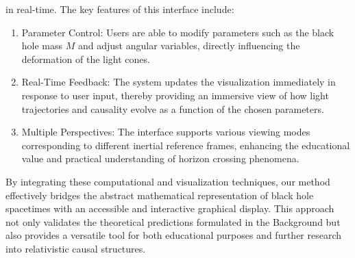 \documentclass{article}
\begin{document}
in real-time. The key features of this interface include:\begin{enumerate}  \item Parameter Control: Users are able to modify parameters such as the black hole mass $M$ and adjust angular variables, directly influencing the deformation of the light cones.  \item Real-Time Feedback: The system updates the visualization immediately in response to user input, thereby providing an immersive view of how light trajectories and causality evolve as a function of the chosen parameters.  \item Multiple Perspectives: The interface supports various viewing modes corresponding to different inertial reference frames, enhancing the educational value and practical understanding of horizon crossing phenomena.\end{enumerate}By integrating these computational and visualization techniques, our method effectively bridges the abstract mathematical representation of black hole spacetimes with an accessible and interactive graphical display. This approach not only validates the theoretical predictions formulated in the Background but also provides a versatile tool for both educational purposes and further research into relativistic causal structures.
\end{document}
